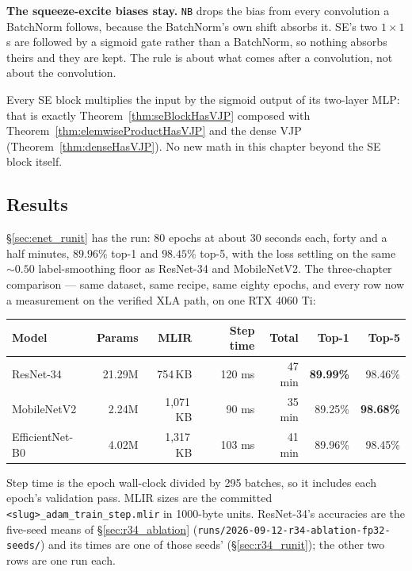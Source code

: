 \textbf{The squeeze-excite biases stay.} \texttt{NB} drops the bias from
every convolution a BatchNorm follows, because the BatchNorm's own shift
absorbs it. SE's two $1 \times 1$s are followed by a sigmoid gate rather
than a BatchNorm, so nothing absorbs theirs and they are kept. The rule
is about what comes after a convolution, not about the
convolution.

Every SE block multiplies the input by the sigmoid output of its
two-layer MLP: that is exactly Theorem~\ref{thm:seBlockHasVJP} composed
with Theorem~\ref{thm:elemwiseProductHasVJP} and the dense VJP
(Theorem~\ref{thm:denseHasVJP}). No new math in this chapter beyond the SE
block itself.

\subsection*{Results}

\S\ref{sec:enet_runit} has the run: 80 epochs at about 30 seconds each,
forty and a half minutes, $\mathbf{89.96\%}$ top-1 and $\mathbf{98.45\%}$
top-5, with the loss settling on the same ${\sim}0.50$ label-smoothing
floor as ResNet-34 and MobileNetV2. The three-chapter comparison --- same
dataset, same recipe, same eighty epochs, and every row now a measurement
on the verified XLA path, on one RTX 4060 Ti:

\begin{center}
\begin{tabular}{l r r r r r r}
\hline
Model            & Params  & MLIR       & Step time & Total    & Top-1 & Top-5 \\
\hline
ResNet-34        & 21.29M  & 754\,KB    & 120 ms    & 47 min   & \textbf{89.99\%} & 98.46\% \\
MobileNetV2      &  2.24M  & 1{,}071\,KB &  90 ms   & 35 min   & 89.25\% & \textbf{98.68\%} \\
EfficientNet-B0  &  4.02M  & 1{,}317\,KB & 103 ms   & 41 min   & 89.96\% & 98.45\% \\
\hline
\end{tabular}
\end{center}

\noindent Step time is the epoch wall-clock divided by 295 batches, so it
includes each epoch's validation pass. MLIR sizes are the committed
\texttt{<slug>\_adam\_train\_step.mlir} in 1000-byte units. ResNet-34's accuracies are the five-seed means of \S\ref{sec:r34_ablation}
(\texttt{runs/2026-09-12-r34-ablation-fp32-seeds/}) and its times are one of those seeds' (\S\ref{sec:r34_runit}); the other two rows
are one run each.

